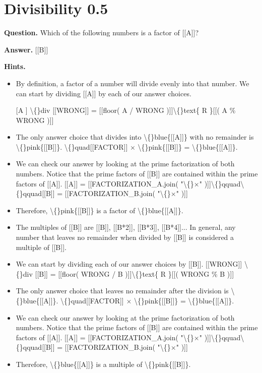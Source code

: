 \documentclass{article}
\begin{document}
\section*{Divisibility 0.5}
\textbf{Question.} Which of the following numbers is a factor of [[A]]?

\textbf{Answer.} [[B]]

\textbf{Hints.}
\begin{itemize}
  \item By definition, a factor of a number will divide evenly into that number. We can start by dividing [[A]] by each of our answer choices.
  \item [[A]] \textbackslash\{\}div [[WRONG]] = [[floor( A / WRONG )]]\textbackslash\{\}text\{ R \}[[( A \% WRONG )]]
  \item The only answer choice that divides into \textbackslash\{\}blue\{[[A]]\} with no remainder is \textbackslash\{\}pink\{[[B]]\}.
                        \textbackslash\{\}quad[[FACTOR]] $\times$ \textbackslash\{\}pink\{[[B]]\} = \textbackslash\{\}blue\{[[A]]\}.
  \item We can check our answer by looking at the prime factorization of both numbers. Notice that the prime factors of [[B]] are contained within the prime factors of [[A]].
                        [[A]] = [[FACTORIZATION\_A.join( "\textbackslash\{\}$\times$" )]]\textbackslash\{\}qquad\textbackslash\{\}qquad[[B]] = [[FACTORIZATION\_B.join( "\textbackslash\{\}$\times$" )]]
  \item Therefore, \textbackslash\{\}pink\{[[B]]\} is a factor of \textbackslash\{\}blue\{[[A]]\}.
  \item The multiples of [[B]] are [[B]], [[B*2]], [[B*3]], [[B*4]]...
                        In general, any number that leaves no remainder when divided by [[B]] is considered a multiple of [[B]].
  \item We can start by dividing each of our answer choices by [[B]].
                        [[WRONG]] \textbackslash\{\}div [[B]] = [[floor( WRONG / B )]]\textbackslash\{\}text\{ R \}[[( WRONG \% B )]]
  \item The only answer choice that leaves no remainder after the division is \textbackslash\{\}blue\{[[A]]\}.
                        \textbackslash\{\}quad[[FACTOR]] $\times$ \textbackslash\{\}pink\{[[B]]\} = \textbackslash\{\}blue\{[[A]]\}.
  \item We can check our answer by looking at the prime factorization of both numbers. Notice that the prime factors of [[B]] are contained within the prime factors of [[A]].
                        [[A]] = [[FACTORIZATION\_A.join( "\textbackslash\{\}$\times$" )]]\textbackslash\{\}qquad\textbackslash\{\}qquad[[B]] = [[FACTORIZATION\_B.join( "\textbackslash\{\}$\times$" )]]
  \item Therefore, \textbackslash\{\}blue\{[[A]]\} is a multiple of \textbackslash\{\}pink\{[[B]]\}.
\end{itemize}
\end{document}
